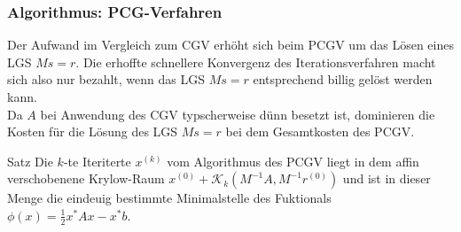     \subsubsection{Algorithmus: PCG-Verfahren}
    Der Aufwand im Vergleich zum CGV erhöht sich beim PCGV um das Lösen eines LGS $Ms=r$. Die erhoffte schnellere
    Konvergenz des Iterationsverfahren macht sich also nur bezahlt, wenn das LGS $Ms=r$ entsprechend billig gelöst
    werden kann. \\
    Da $A$ bei Anwendung des CGV typscherweise dünn besetzt ist, dominieren die Kosten für die Lösung des LGS $Ms=r$ 
    bei dem Gesamtkosten des PCGV.
    \begin{thmbox}{Satz}
        Die $k$-te Iteriterte $x^{(k)}$ vom Algorithmus des PCGV liegt in dem affin verschobenene Krylow-Raum
        $x^{(0)} + \mathcal{K}_k(M^{-1}A, M^{-1}r^{(0)})$ und ist in dieser Menge die eindeuig bestimmte Minimalstelle
        des Fuktionals $\phi(x) = \tfrac{1}{2}x^*Ax-x^*b$.
    \end{thmbox}
